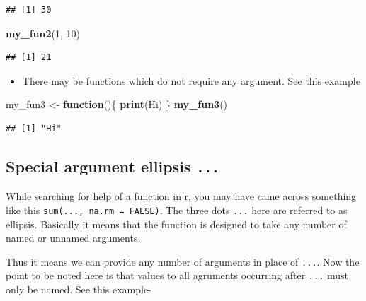 \documentclass[
]{book}
\newenvironment{Shaded}{\begin{snugshade}}{\end{snugshade}}
\newcommand{\ControlFlowTok}[1]{\textcolor[rgb]{0.13,0.29,0.53}{\textbf{#1}}}
\newcommand{\DecValTok}[1]{\textcolor[rgb]{0.00,0.00,0.81}{#1}}
\newcommand{\FunctionTok}[1]{\textcolor[rgb]{0.13,0.29,0.53}{\textbf{#1}}}
\newcommand{\NormalTok}[1]{#1}
\newcommand{\OtherTok}[1]{\textcolor[rgb]{0.56,0.35,0.01}{#1}}
\newcommand{\StringTok}[1]{\textcolor[rgb]{0.31,0.60,0.02}{#1}}
\providecommand{\tightlist}{%
  \setlength{\itemsep}{0pt}\setlength{\parskip}{0pt}}
\begin{document}
\begin{verbatim}
## [1] 30
\end{verbatim}

\begin{Shaded}
\begin{Highlighting}[]
\FunctionTok{my\_fun2}\NormalTok{(}\DecValTok{1}\NormalTok{, }\DecValTok{10}\NormalTok{)}
\end{Highlighting}
\end{Shaded}

\begin{verbatim}
## [1] 21
\end{verbatim}

\begin{itemize}
\tightlist
\item
  There may be functions which do not require any argument. See this example
\end{itemize}

\begin{Shaded}
\begin{Highlighting}[]
\NormalTok{my\_fun3 }\OtherTok{\textless{}{-}} \ControlFlowTok{function}\NormalTok{()\{}
  \FunctionTok{print}\NormalTok{(}\StringTok{\textquotesingle{}Hi\textquotesingle{}}\NormalTok{)}
\NormalTok{\}}
\FunctionTok{my\_fun3}\NormalTok{()}
\end{Highlighting}
\end{Shaded}

\begin{verbatim}
## [1] "Hi"
\end{verbatim}

\hypertarget{special-argument-ellipsis-...}{%
\subsection*{\texorpdfstring{Special argument ellipsis \texttt{...}}{Special argument ellipsis ...}}\label{special-argument-ellipsis-...}}

While searching for help of a function in r, you may have came across something like this \texttt{sum(...,\ na.rm\ =\ FALSE)}. The three dots \texttt{...} here are referred to as ellipsis. Basically it means that the function is designed to take any number of named or unnamed arguments.

Thus it means we can provide any number of arguments in place of \texttt{...}. Now the point to be noted here is that values to all agruments occurring after \texttt{...} must only be named. See this example-
\end{document}

